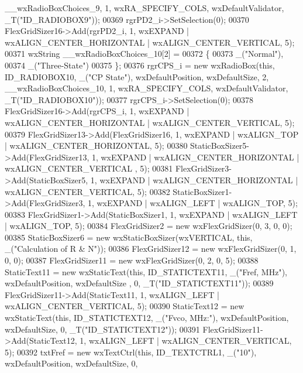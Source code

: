 \begin{DoxyCode}
      \_\_wxRadioBoxChoices\_9, 1, wxRA\_SPECIFY\_COLS, wxDefaultValidator, _T(\textcolor{stringliteral}{"ID\_RADIOBOX9"}));
00369     rgrPD2\_i->SetSelection(0);
00370     FlexGridSizer16->Add(rgrPD2\_i, 1, wxEXPAND | wxALIGN\_CENTER\_HORIZONTAL | wxALIGN\_CENTER\_VERTICAL, 5);
00371     wxString \_\_wxRadioBoxChoices\_10[2] =
00372     \{
00373         \_(\textcolor{stringliteral}{"Normal"}),
00374         \_(\textcolor{stringliteral}{"Three-State"})
00375     \};
00376     rgrCPS\_i = \textcolor{keyword}{new} wxRadioBox(\textcolor{keyword}{this}, ID\_RADIOBOX10, \_(\textcolor{stringliteral}{"CP State"}), wxDefaultPosition, wxDefaultSize, 2, 
      \_\_wxRadioBoxChoices\_10, 1, wxRA\_SPECIFY\_COLS, wxDefaultValidator, _T(\textcolor{stringliteral}{"ID\_RADIOBOX10"}));
00377     rgrCPS\_i->SetSelection(0);
00378     FlexGridSizer16->Add(rgrCPS\_i, 1, wxEXPAND | wxALIGN\_CENTER\_HORIZONTAL | wxALIGN\_CENTER\_VERTICAL, 5);
00379     FlexGridSizer13->Add(FlexGridSizer16, 1, wxEXPAND | wxALIGN\_TOP | wxALIGN\_CENTER\_HORIZONTAL, 5);
00380     StaticBoxSizer5->Add(FlexGridSizer13, 1, wxEXPAND | wxALIGN\_CENTER\_HORIZONTAL | wxALIGN\_CENTER\_VERTICAL
      , 5);
00381     FlexGridSizer3->Add(StaticBoxSizer5, 1, wxEXPAND | wxALIGN\_CENTER\_HORIZONTAL | wxALIGN\_CENTER\_VERTICAL,
       5);
00382     StaticBoxSizer1->Add(FlexGridSizer3, 1, wxEXPAND | wxALIGN\_LEFT | wxALIGN\_TOP, 5);
00383     FlexGridSizer1->Add(StaticBoxSizer1, 1, wxEXPAND | wxALIGN\_LEFT | wxALIGN\_TOP, 5);
00384     FlexGridSizer2 = \textcolor{keyword}{new} wxFlexGridSizer(0, 3, 0, 0);
00385     StaticBoxSizer6 = \textcolor{keyword}{new} wxStaticBoxSizer(wxVERTICAL, \textcolor{keyword}{this}, \_(\textcolor{stringliteral}{"Calculation of R & N"}));
00386     FlexGridSizer12 = \textcolor{keyword}{new} wxFlexGridSizer(0, 1, 0, 0);
00387     FlexGridSizer11 = \textcolor{keyword}{new} wxFlexGridSizer(0, 2, 0, 5);
00388     StaticText11 = \textcolor{keyword}{new} wxStaticText(\textcolor{keyword}{this}, ID\_STATICTEXT11, \_(\textcolor{stringliteral}{"Fref, MHz"}), wxDefaultPosition, wxDefaultSize
      , 0, _T(\textcolor{stringliteral}{"ID\_STATICTEXT11"}));
00389     FlexGridSizer11->Add(StaticText11, 1, wxALIGN\_LEFT | wxALIGN\_CENTER\_VERTICAL, 5);
00390     StaticText12 = \textcolor{keyword}{new} wxStaticText(\textcolor{keyword}{this}, ID\_STATICTEXT12, \_(\textcolor{stringliteral}{"Fvco, MHz:"}), wxDefaultPosition, 
      wxDefaultSize, 0, _T(\textcolor{stringliteral}{"ID\_STATICTEXT12"}));
00391     FlexGridSizer11->Add(StaticText12, 1, wxALIGN\_LEFT | wxALIGN\_CENTER\_VERTICAL, 5);
00392     txtFref = \textcolor{keyword}{new} wxTextCtrl(\textcolor{keyword}{this}, ID\_TEXTCTRL1, \_(\textcolor{stringliteral}{"10"}), wxDefaultPosition, wxDefaultSize, 0, 

\end{DoxyCode}
